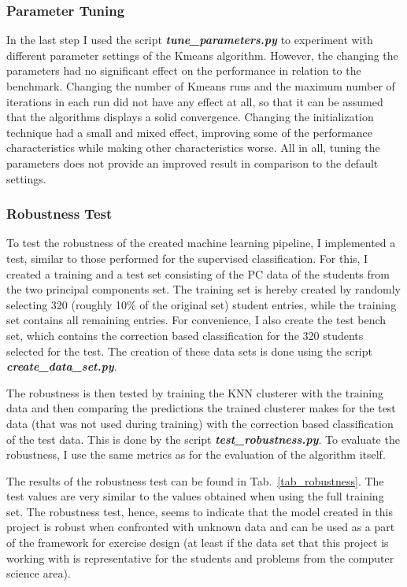 \subsubsection{Parameter Tuning}
In the last step I used the script \textbf{\emph{tune\_parameters.py}} to experiment with different parameter settings of the Kmeans algorithm. However, the changing the parameters had no significant effect on the performance in relation to the benchmark. Changing the number of Kmeans runs and the maximum number of iterations in each run did not have any effect at all, so that it can be assumed that the algorithms displays a solid convergence. Changing the initialization technique had a small and mixed effect, improving some of the performance characteristics while making other characteristics worse. All in all, tuning the parameters does not provide an improved result in comparison to the default settings. 

\subsubsection{Robustness Test}
To test the robustness of the created machine learning pipeline, I implemented a test, similar to those performed for the supervised classification. For this, I created a training and a test set consisting of the PC data of the students from the two principal components set. The training set is hereby created by randomly selecting 320 (roughly 10\% of the original set) student entries, while the training set contains all remaining entries. For convenience, I also create the test bench set, which contains the correction based classification for the 320 students selected for the test. The creation of these data sets is done using the script \textbf{\emph{create\_data\_set.py}}.

The robustness is then tested by training the KNN clusterer with the training data and then comparing the predictions the trained clusterer makes for the test data (that was not used during training) with the correction based classification of the test data. This is done by the script \textbf{\emph{test\_robustness.py}}. To evaluate the robustness, I use the same metrics as for the evaluation of the algorithm itself.

The results of the robustness test can be found in Tab.~\ref{tab_robustness}. The test values are very similar to the values obtained when using the full training set. The robustness test, hence, seems to indicate that the model created in this project is robust when confronted with unknown data and can be used as a part of the framework for exercise design (at least if the data set that this project is working with is representative for the students and problems from the computer science area).

